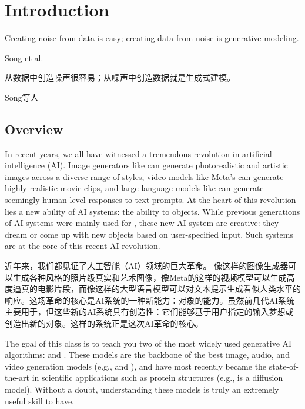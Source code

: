 \section{Introduction}
\label{sec:introduction}
\epigraph{Creating noise from data is easy; creating data from noise is generative modeling.}{Song et al. \cite{yangsong_sde}}

\epigraph{从数据中创造噪声很容易；从噪声中创造数据就是生成式建模。}{Song等人 \cite{yangsong_sde}}


\subsection{Overview}
In recent years, we all have witnessed a tremendous revolution in artificial intelligence (AI). 
Image generators like  can generate photorealistic and artistic images across a diverse range of styles, video models like Meta's  can generate highly realistic movie clips, and large language models like  can generate seemingly human-level responses to text prompts. At the heart of this revolution lies a new ability of AI systems: the ability to  objects. While previous generations of AI systems were mainly used for , these new AI system are creative: they dream or come up with new objects based on user-specified input. Such  systems are at the core of this recent AI revolution.  

近年来，我们都见证了人工智能（AI）领域的巨大革命。
像这样的图像生成器可以生成各种风格的照片级真实和艺术图像，像Meta的这样的视频模型可以生成高度逼真的电影片段，而像这样的大型语言模型可以对文本提示生成看似人类水平的响应。这场革命的核心是AI系统的一种新能力：对象的能力。虽然前几代AI系统主要用于，但这些新的AI系统具有创造性：它们能够基于用户指定的输入梦想或创造出新的对象。这样的系统正是这次AI革命的核心。

The goal of this class is to teach you two of the most widely used generative AI algorithms:  \citep{song2020score} and  \citep{lipman2022flow,liu2022flow, albergo2023stochastic, lipman2024flow}. These models are the backbone of the best image, audio, and video generation models (e.g.,  and ), and have most recently became the state-of-the-art in scientific applications such as protein structures (e.g.,  is a diffusion model). Without a doubt, understanding these models is truly an extremely useful skill to have.

